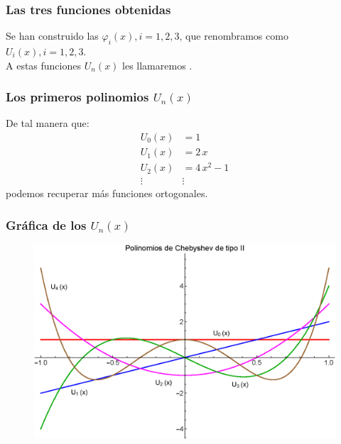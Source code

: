 \documentclass[12pt]{beamer}
\begin{document}
\begin{frame}
\frametitle{Las tres funciones obtenidas}
Se han construido las $\varphi_{i}(x), i = 1, 2, 3$, que renombramos como $U_{i}(x), i = 1, 2, 3$.
\\
\bigskip
\pause
A estas funciones $U_{n}(x)$ les llamaremos .
\end{frame}
\begin{frame}
\frametitle{Los primeros polinomios $U_{n}(x)$}
De tal manera que:
\pause
\begin{align*}
U_{0} (x) &= 1 \\[0.5em]
U_{1} (x) &= 2 \, x \\[0.5em]
U_{2} (x) &= 4 \, x^{2} - 1 \\[0.5em]
\vdots & \vdots
\end{align*}
podemos recuperar más funciones ortogonales.
\end{frame}
\begin{frame}
\frametitle{Gráfica de los $U_{n}(x)$}
\begin{figure}
    \centering
    \includegraphics[scale=0.62]{Imagenes/Gram_Schmidt_Chebyshev_2.eps}
\end{figure}
\end{frame}
\end{document}
